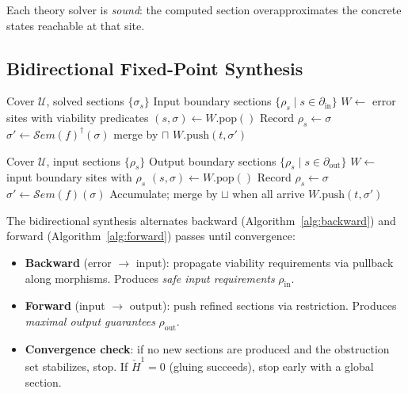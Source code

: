 \documentclass[acmsmall,screen]{acmart}
\theoremstyle{remark}
\newcommand{\Sem}{\mathcal{S}\mathit{em}}
\newcommand{\Hc}[1]{\check{H}^{#1}}
\begin{document}
Each theory solver is \emph{sound}: the computed section
overapproximates the concrete states reachable at that site.

\subsection{Bidirectional Fixed-Point Synthesis}\label{sec:synthesis}

\begin{algorithm}[t]
\caption{Backward safe-input synthesis}
\label{alg:backward}
\begin{algorithmic}[1]
\Require Cover $\mathcal{U}$, solved sections $\{\sigma_s\}$
\Ensure Input boundary sections $\{\rho_s \mid s \in \partial_{\mathrm{in}}\}$
\State $W \gets$ error sites with viability predicates
  \State $(s, \sigma) \gets W.\text{pop}()$
    \State Record $\rho_s \gets \sigma$
  \Else
      \State $\sigma' \gets \Sem(f)^{\dagger}(\sigma)$
       merge by $\sqcap$
      \EndIf
      \State $W.\text{push}(t, \sigma')$
    \EndFor
  \EndIf
\EndWhile
\end{algorithmic}
\end{algorithm}

\begin{algorithm}[t]
\caption{Forward output synthesis}
\label{alg:forward}
\begin{algorithmic}[1]
\Require Cover $\mathcal{U}$, input sections $\{\rho_s\}$
\Ensure Output boundary sections $\{\rho_s \mid s \in \partial_{\mathrm{out}}\}$
\State $W \gets$ input boundary sites with $\rho_s$
  \State $(s, \sigma) \gets W.\text{pop}()$
    \State Record $\rho_s \gets \sigma$
  \EndIf
    \State $\sigma' \gets \Sem(f)(\sigma)$ 
      \State Accumulate; merge by $\sqcup$ when all arrive
    \Else
      \State $W.\text{push}(t, \sigma')$
    \EndIf
  \EndFor
\EndWhile
\end{algorithmic}
\end{algorithm}

The bidirectional synthesis alternates backward (Algorithm~\ref{alg:backward})
and forward (Algorithm~\ref{alg:forward}) passes until convergence:

\begin{itemize}[nosep]
  \item \textbf{Backward} (error $\to$ input): propagate viability
    requirements via pullback along morphisms.  Produces \emph{safe
    input requirements} $\rho_{\mathrm{in}}$.
  \item \textbf{Forward} (input $\to$ output): push refined sections
    via restriction.  Produces \emph{maximal output guarantees}
    $\rho_{\mathrm{out}}$.
  \item \textbf{Convergence check}: if no new sections are produced
    and the obstruction set stabilizes, stop.  If $\Hc{1} = 0$
    (gluing succeeds), stop early with a global section.
\end{itemize}
\end{document}

